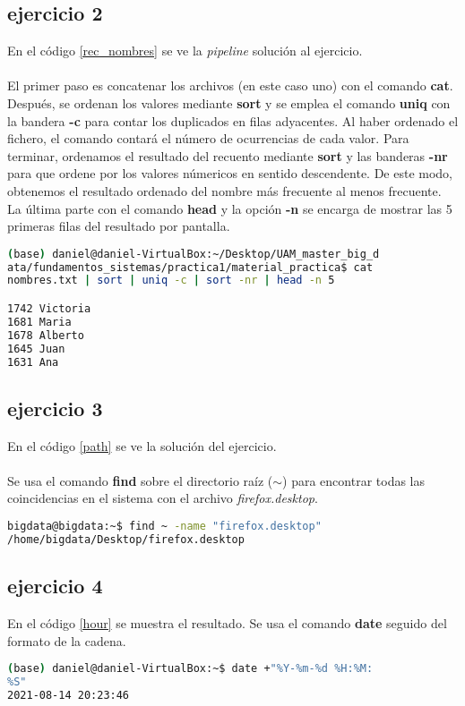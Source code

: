 \subsection*{ejercicio 2}
%
En el código \ref{rec_nombres} se ve la \textit{pipeline} solución al ejercicio.\\\\
El primer paso es concatenar los archivos (en este caso uno) con el comando \textbf{cat}. Después, se ordenan los valores mediante \textbf{sort} y se emplea el comando \textbf{uniq} con la bandera \textbf{-c} para contar los duplicados en filas adyacentes. Al haber ordenado el fichero, el comando contará el número de ocurrencias de cada valor. Para terminar, ordenamos el resultado del recuento mediante \textbf{sort} y las banderas \textbf{-nr} para que ordene por los valores númericos en sentido descendente. De este modo, obtenemos el resultado ordenado del nombre más frecuente al menos frecuente. La última parte con el comando \textbf{head} y la opción \textbf{-n} se encarga de mostrar las 5 primeras filas del resultado por pantalla. 
\begin{lstlisting}[language=bash,caption={Recuento de valores en nombres.txt}, label={rec_nombres}]
(base) daniel@daniel-VirtualBox:~/Desktop/UAM_master_big_d
ata/fundamentos_sistemas/practica1/material_practica$ cat 
nombres.txt | sort | uniq -c | sort -nr | head -n 5

1742 Victoria
1681 Maria
1678 Alberto
1645 Juan
1631 Ana
\end{lstlisting}
\subsection*{ejercicio 3}
%
En el código \ref{path} se ve la solución del ejercicio.\\\\
Se usa el comando \textbf{find} sobre el directorio raíz ($\sim$) para encontrar todas las coincidencias en el sistema con el archivo \textit{firefox.desktop}.
\begin{lstlisting}[language=bash,caption={Búsqueda del archivo firefox.desktop}, label={path}]
bigdata@bigdata:~$ find ~ -name "firefox.desktop"
/home/bigdata/Desktop/firefox.desktop
\end{lstlisting}
\subsection*{ejercicio 4}
%
En el código \ref{hour} se muestra el resultado. Se usa el comando \textbf{date} seguido del formato de la cadena. 
\begin{lstlisting}[language=bash,caption={Fecha en formato}, label={hour}]
(base) daniel@daniel-VirtualBox:~$ date +"%Y-%m-%d %H:%M:
%S" 
2021-08-14 20:23:46
\end{lstlisting}
